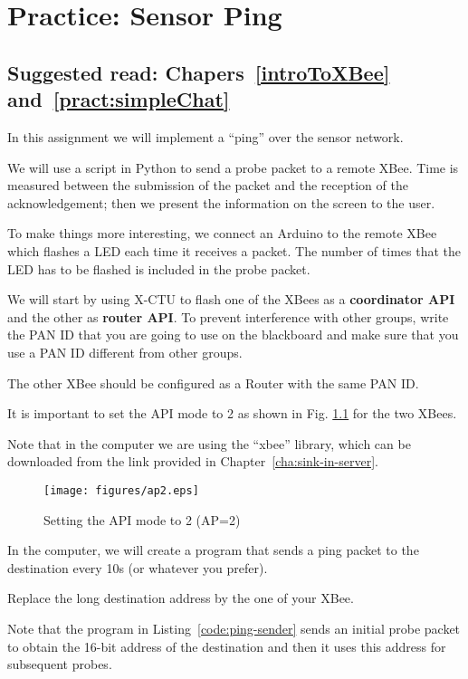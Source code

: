 \chapter{Practice: Sensor Ping}
\section*{Suggested read: Chapers~\ref{introToXBee} and~\ref{pract:simpleChat}}

In this assignment we will implement a ``ping'' over the sensor network.

We will use a script in Python to send a probe packet to a remote XBee.
Time is measured between the submission of the packet and the reception of the acknowledgement; then we present the information on the screen to the user.

To make things more interesting, we connect an Arduino to the remote XBee which flashes a LED each time it receives a packet.
The number of times that the LED has to be flashed is included in the probe packet.

We will start by using X-CTU to flash one of the XBees as a {\bfseries coordinator API} and the other as {\bfseries router API}.
To prevent interference with other groups, write the PAN ID that you are going to use on the blackboard and make sure that you use a PAN ID different from other groups.

The other XBee should be configured as a Router with the same PAN ID.

It is important to set the API mode to 2 as shown in Fig. \ref{fig:ap2} for the two XBees.

Note that in the computer we are using the ``xbee'' library, which can be downloaded from the link provided in Chapter~\ref{cha:sink-in-server}.


\begin{figure}[htbp]
  \centering
  \texttt{[image: figures/ap2.eps]}
  \caption{Setting the API mode to 2 (AP=2)}
  \label{fig:ap2}
\end{figure}

In the computer, we will create a program that sends a ping packet to the destination every 10s (or whatever you prefer).

Replace the long destination address by the one of your XBee.

Note that the program in Listing~\ref{code:ping-sender} sends an initial probe packet to obtain the 16-bit address of the destination and then it uses this address for subsequent probes.

